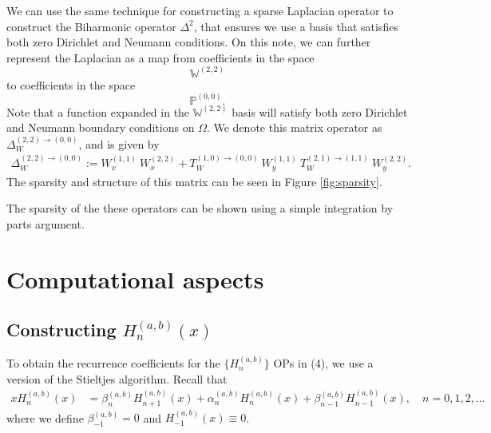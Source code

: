 \documentclass[11pt, oneside]{article}   	%
\newcommand{\bigPoo}{{\mathbb{P}^{(0,0)}}}
\newcommand{\laplacewtt}{\Delta_W^{(2,2)\to(0,0)}}
\newcommand{\bigW}{\mathbb{W}}
\begin{document}
We can use the same technique for constructing a sparse Laplacian operator to construct the Biharmonic operator $\Delta^2$, that ensures we use a basis that satisfies both zero Dirichlet and Neumann conditions. On this note, we can further represent the Laplacian as a map from coefficients in the space 
$$
\bigW^{(2,2)}
$$
to coefficients in the space
$$
\bigPoo.
$$
Note that a function expanded in the $\bigW^{(2,2)}$ basis will satisfy both zero Dirichlet and Neumann boundary conditions on $\Omega$. We denote this matrix operator as $\laplacewtt$, and is given by
\begin{align}
	\laplacewtt := W_x^{(1,1)} \: W_x^{(2,2)} + T_W^{(1,0)\to(0,0)} \: W_y^{(1,1)} \: T_W^{(2,1)\to(1,1)} \: W_y^{(2,2)}.
\end{align}
The sparsity and structure of this matrix can be seen in Figure \ref{fig:sparsity}.

The sparsity of the these operators can be shown using a simple integration by parts argument.



\section{Computational aspects}\label{Section:Computation}

\subsection{Constructing $H_n^{(a,b)}(x)$}

To obtain the recurrence coefficients for the $\{H_n^{(a,b)}\}$ OPs in (4), we use a version of the Stieltjes algorithm. Recall that
\begin{align}
x H_n^{(a,b)}(x) &= \beta_n^{(a,b)} H_{n+1}^{(a,b)}(x) + \alpha_n^{(a,b)} H_n^{(a,b)}(x) + \beta_{n-1}^{(a,b)} H_{n-1}^{(a,b)}(x), \quad n = 0,1,2,\dots
\end{align}
where we define $\beta_{-1}^{(a,b)} = 0$ and $H_{-1}^{(a,b)}(x) \equiv 0$.
\end{document}
